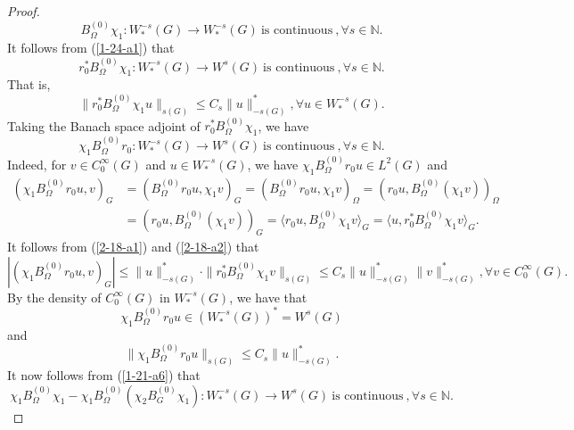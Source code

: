 \documentclass[a4paper,centertags,oneside,12pt]{amsart}
\numberwithin{equation}{section}
\begin{document}
\begin{proof}
\begin{equation}
    B_\Omega^{(0)}\chi_1: W_\ast^{-s}(G)\rightarrow W_\ast^{-s}(G)~\text{is continuous}~, \forall s\in\mathbb N. 
\end{equation}
It follows from (\ref{1-24-a1}) that
\begin{equation}\label{2-18-a1}
    r_0^\ast B_\Omega^{(0)}\chi_1: W_\ast^{-s}(G)\rightarrow W^s(G)~\text{is continuous}~, \forall s\in\mathbb N.
\end{equation}
That is, 
\begin{equation*}
    \|r_0^\ast B_\Omega^{(0)}\chi_1 u\|_{s(G)}\leq C_s\|u\|_{-s(G)}^\ast, \forall u\in W_\ast^{-s}(G).
\end{equation*}
Taking  the Banach space adjoint of $r_0^\ast B_\Omega^{(0)}\chi_1$, we  have
\begin{equation*}
    \chi_1 B_\Omega^{(0)}r_0: W_\ast^{-s}(G)\rightarrow W^s(G)~\text{is continuous}~, \forall s\in\mathbb N.
\end{equation*}
Indeed, for $v\in C_0^\infty(G)$ and $u\in W_\ast^{-s}(G)$, we have $\chi_1 B_\Omega^{(0)}r_0 u\in L^2(G)$ and 
\begin{equation}\label{2-18-a2}
\begin{split}
    (\chi_1 B_\Omega^{(0)}r_0 u, v)_G&=(B_\Omega^{(0)}r_0 u, \chi_1v)_G=(B_\Omega^{(0)}r_0 u, \chi_1v)_\Omega
    =(r_0 u, B_\Omega^{(0)}(\chi_1v))_\Omega\\
    &=(r_0 u, B_\Omega^{(0)}(\chi_1v))_G
    =\langle r_0 u, B_\Omega^{(0)}\chi_1 v\rangle_G=\langle u, r_0^\ast B_\Omega^{(0)}\chi_1v\rangle_G.
    \end{split}
\end{equation}
It follows from (\ref{2-18-a1}) and (\ref{2-18-a2}) that
\begin{equation*}
    |(\chi_1 B_\Omega^{(0)}r_0 u, v)_G|\leq \|u\|_{-s(G)}^\ast \cdot\|r_0^\ast B_\Omega^{(0)}\chi_1 v\|_{s(G)}\leq C_s\|u\|_{-s(G)}^\ast\|v\|_{-s(G)}^\ast, \forall v\in C_0^\infty(G).
\end{equation*}
By the density of $C_0^\infty(G)$ in $W_{\ast}^{-s}(G)$, we have that $$\chi_1 B_\Omega^{(0)}r_0 u\in (W^{-s}_\ast(G))^\ast=W^s(G)$$ and 
\begin{equation*}
    \|\chi_1 B_\Omega^{(0)}r_0 u\|_{s(G)}\leq C_s\|u\|_{-s(G)}^\ast.
\end{equation*}
It now follows from (\ref{1-21-a6}) that
\begin{equation}\label{1-21-b9}
    \chi_1 B_\Omega^{(0)}\chi_1-\chi_1 B_\Omega^{(0)}(\chi_2 B_G^{(0)}\chi_1): W_\ast^{-s}(G)\rightarrow W^s(G)~\text{is continuous}~, \forall s\in\mathbb N.

\end{equation}
\end{proof}
\end{document}

